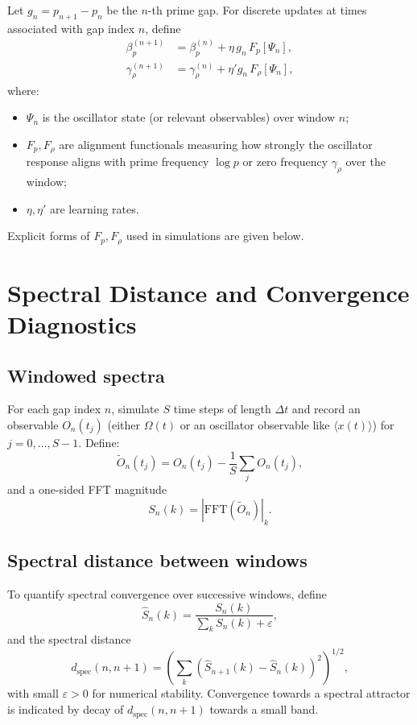 \documentclass[11pt]{article}
\begin{document}
Let $g_n = p_{n+1} - p_n$ be the $n$-th prime gap.\cite{file3} For discrete updates at times associated with gap index $n$, define
\begin{align*}
\beta_p^{(n+1)} &= \beta_p^{(n)} + \eta\, g_n\, F_p[\Psi_n], \\
\gamma_{\rho}^{(n+1)} &= \gamma_{\rho}^{(n)} + \eta' g_n\, F_{\rho}[\Psi_n],
\end{align*}
where:
\begin{itemize}[nosep]
    \item $\Psi_n$ is the oscillator state (or relevant observables) over window $n$;
    \item $F_p,F_{\rho}$ are alignment functionals measuring how strongly the oscillator response aligns with prime frequency $\log p$ or zero frequency $\gamma_{\rho}$ over the window;
    \item $\eta,\eta'$ are learning rates.
\end{itemize}
Explicit forms of $F_p,F_{\rho}$ used in simulations are given below.

\section{Spectral Distance and Convergence Diagnostics}

\subsection{Windowed spectra}

For each gap index $n$, simulate $S$ time steps of length $\Delta t$ and record an observable $O_n(t_j)$ (either $\Omega(t)$ or an oscillator observable like $\langle x(t)\rangle$) for $j=0,\dots,S-1$. Define:
\[
\tilde{O}_n(t_j) = O_n(t_j) - \frac{1}{S}\sum_{j} O_n(t_j),
\]
and a one-sided FFT magnitude
\[
S_n(k) = \left| \mathrm{FFT}(\tilde{O}_n)\right|_k.
\]

\subsection{Spectral distance between windows}

To quantify spectral convergence over successive windows, define
\[
\hat{S}_n(k) = \frac{S_n(k)}{\sum_{k} S_n(k) + \varepsilon},
\]
and the spectral distance
\[
d_{\text{spec}}(n,n+1) = \left( \sum_{k} \left( \hat{S}_{n+1}(k) - \hat{S}_n(k) \right)^2 \right)^{1/2},
\]
with small $\varepsilon>0$ for numerical stability. Convergence towards a spectral attractor is indicated by decay of $d_{\text{spec}}(n,n+1)$ towards a small band.
\end{document}
